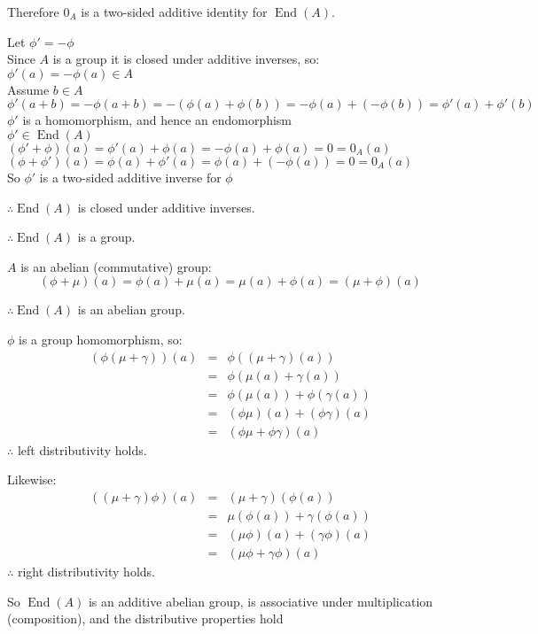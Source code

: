 \documentclass[letterpaper,12pt,fleqn]{article}
\DeclareMathOperator{\End}{End}
\begin{document}
\begin{enumerate}
  Therefore $0_A$ is a two-sided additive identity for $\End(A)$.

  Let $\phi'=-\phi$ \\
  Since $A$ is a group it is closed under additive inverses, so: \\
  $\phi'(a)=-\phi(a)\in A$ \\
  Assume $b\in A$ \\
  $\phi'(a+b)=-\phi(a+b)=-(\phi(a)+\phi(b))=-\phi(a)+(-\phi(b))=\phi'(a)+\phi'(b)$ \\
  $\phi'$ is a homomorphism, and hence an endomorphism \\
  $\phi'\in\End(A)$ \\
  $(\phi'+\phi)(a)=\phi'(a)+\phi(a)=-\phi(a)+\phi(a)=0=0_A(a)$ \\
  $(\phi+\phi')(a)=\phi(a)+\phi'(a)=\phi(a)+(-\phi(a))=0=0_A(a)$ \\
  So $\phi'$ is a two-sided additive inverse for $\phi$

  $\therefore\End(A)$ is closed under additive inverses.

  $\therefore\End(A)$ is a group.

  $A$ is an abelian (commutative) group: \\
  \[(\phi+\mu)(a)=\phi(a)+\mu(a)=\mu(a)+\phi(a)=(\mu+\phi)(a)\]

  $\therefore\End(A)$ is an abelian group.

  $\phi$ is a group homomorphism, so:
  \begin{eqnarray*}
    (\phi(\mu+\gamma))(a) &=& \phi((\mu+\gamma)(a)) \\
    &=& \phi(\mu(a)+\gamma(a)) \\
    &=& \phi(\mu(a))+\phi(\gamma(a)) \\
    &=& (\phi\mu)(a)+(\phi\gamma)(a) \\
    &=& (\phi\mu+\phi\gamma)(a)
  \end{eqnarray*}
  $\therefore$ left distributivity holds.

  Likewise:
  \begin{eqnarray*}
    ((\mu+\gamma)\phi)(a) &=& (\mu+\gamma)(\phi(a)) \\
    &=& \mu(\phi(a))+\gamma(\phi(a)) \\
    &=& (\mu\phi)(a)+(\gamma\phi)(a) \\
    &=& (\mu\phi+\gamma\phi)(a)
  \end{eqnarray*}
  $\therefore$ right distributivity holds.

  So $\End(A)$ is an additive abelian group, is associative under multiplication
  (composition), and the distributive properties hold


\end{enumerate}
\end{document}
